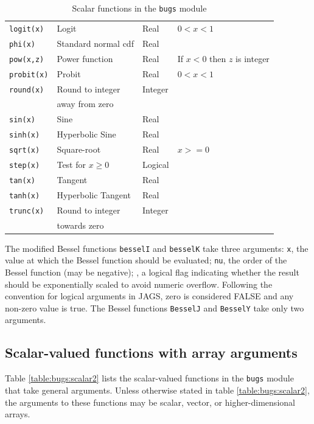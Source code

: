 \documentclass[11pt, a4paper, titlepage]{report}
\begin{document}
\begin{table}
\begin{center}
\begin{tabular}{llll}
\verb+logit(x)+     & Logit               & Real & $0 < x < 1$ \\
\verb+phi(x)+       & Standard normal cdf & Real & \\
\verb+pow(x,z)+     & Power function      & Real & If $x < 0$ then $z$ is integer \\ 
\verb+probit(x)+    & Probit              & Real & $0 < x < 1$ \\
\verb+round(x)+     & Round to integer    & Integer & \\
                    & away from zero      &      & \\
\verb+sin(x)+       & Sine                & Real & \\
\verb+sinh(x)+      & Hyperbolic Sine     & Real & \\
\verb+sqrt(x)+      & Square-root         & Real & $x >= 0$ \\
\verb+step(x)+      & Test for $x \geq 0$ & Logical & \\
\verb+tan(x)+       & Tangent             & Real & \\
\verb+tanh(x)+      & Hyperbolic Tangent  & Real & \\
\verb+trunc(x)+     & Round to integer    & Integer & \\
                    & towards zero        & \\
\hline
\end{tabular}
\caption{Scalar functions in the \texttt{bugs} module \label{table:bugs:scalar}}
\end{center}
\end{table}

The modified Bessel functions \texttt{besselI} and \texttt{besselK}
take three arguments: \texttt{x}, the value at which the Bessel
function should be evaluated; \texttt{nu}, the order of the Bessel
function (may be negative); , a logical flag indicating
whether the result should be exponentially scaled to avoid numeric
overflow. Following the convention for logical arguments in JAGS, zero
is considered FALSE and any non-zero value is true. The Bessel functions
\texttt{BesselJ} and \texttt{BesselY} take only two arguments.

\subsection{Scalar-valued functions with array arguments}

Table \ref{table:bugs:scalar2} lists the scalar-valued functions in the
\texttt{bugs} module that take general arguments. Unless otherwise
stated in table \ref{table:bugs:scalar2}, the arguments to these functions
may be scalar, vector, or higher-dimensional arrays.
\end{document}
